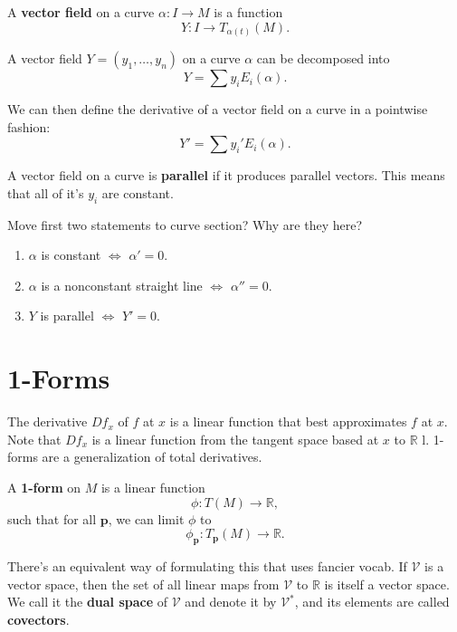 \documentclass[10pt]{report}
\begin{document}
\begin{defn}[]
	A \textbf{vector field} on a curve $\alpha:I\to M$ is a function
	\[
		Y: I \to T_{\alpha(t)}(M).
	\]
\end{defn}

A vector field $Y=(y_1, \dots, y_n)$ on a curve $\alpha$ can be decomposed into
\[
	Y = \sum y_i E_i(\alpha).
\] 

We can then define the derivative of a vector field on a curve in a pointwise fashion:
\[
	Y' = \sum y_i' E_i(\alpha).
\] 

A vector field on a curve is \textbf{parallel} if it produces parallel vectors. This means that all of it's $y_i$ are constant.

\begin{prop}
	{\color{red}Move first two statements to curve section? Why are they here?}
	\begin{enumerate}
		\item $\alpha$ is constant $\iff$ $\alpha'=0$.
		\item $\alpha$ is a nonconstant straight line $\iff$ $\alpha''=0$.
		\item $Y$ is parallel $\iff$ $Y'=0$.
	\end{enumerate}
\end{prop}



\section{1-Forms}

The derivative $Df_{x}$ of $f$ at $x$ is a linear function that best approximates $f$ at $x$. Note that $Df_{x}$ is a linear function from the tangent space based at $x$ to $\mathbb{R}$ l. 1-forms are a generalization of total derivatives.

\begin{defn}
A \textbf{1-form} on $M$ is a linear function
\[
	\phi:T(M)\to \mathbb{R},
\] such that for all $\mathbf{p}$, we can limit $\phi$ to
\[
	\phi_\mathbf{p}:T_{\mathbf{p}}(M)\to \mathbb{R}.
\] 
\end{defn}

There's an equivalent way of formulating this that uses fancier vocab. If $\mathcal{V}$ is a vector space, then the set of all linear maps from $\mathcal{V}$ to $\mathbb{R}$ is itself a vector space. We call it the \textbf{dual space} of $\mathcal{V}$ and denote it by $\mathcal{V}^*$, and its elements are called \textbf{covectors}.
\end{document}
